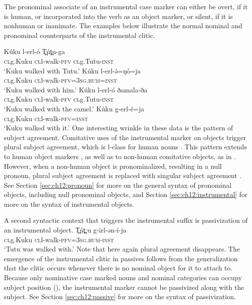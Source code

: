 The pronominal associate of an instrumental case marker can either be overt, if it is human, or incorporated into the verb as an object marker, or silent, if it is nonhuman or inanimate. The examples below illustrate the normal nominal and pronominal counterparts of the instrumental clitic.

\ea 
	\ea	\gll	 Kúku        l-erl-ó             T̪út̪u-ga	\\
				\textsc{cl}g.Kuku \textsc{cl}l-walk-\textsc{pfv} \textsc{cl}g.Tutu-\textsc{inst}		\\
		\glt `Kuku walked with Tutu.'  \label{ex:ch11:witha}
	\ex	\gll	 Kúku        l-erl-ə́=ŋó=ja	\\
				\textsc{cl}g.Kuku \textsc{cl}l-walk-\textsc{pfv}=\textsc{3sg.hum}=\textsc{inst}		\\
		\glt `Kuku walked with him.'\label{ex:ch11:withb}
	\z
\ex	\ea	\gll	 Kúku        l-erl-ó             ðamala-ða	\\
				\textsc{cl}g.Kuku \textsc{cl}l-walk-\textsc{pfv} \textsc{cl}g.Tutu-\textsc{inst}		\\
		\glt `Kuku walked with the camel.' \label{ex:ch11:withcamela}
	\ex	\gll	 Kúku        g-erl-é=ja	\\
				\textsc{cl}g.Kuku \textsc{cl}l-walk-\textsc{pfv}=\textsc{inst}		\\
		\glt `Kuku walked with it.' \label{ex:ch11:withcamelb}
	\z 
\z 
One interesting wrinkle in these data is the pattern of subject agreement. Comitative uses of the instrumental marker on objects trigger plural subject agreement, which is l-class for human nouns . This pattern extends to human object markers , as well as to non-human comitative objects, as in . However, when a non-human object is pronominalized, resulting in a null pronoun, plural subject agreement is replaced with singular subject agreement . See Section \ref{sec:ch12:pronoun} for more on the general syntax of pronominal objects, including null pronominal objects, and Section \ref{sec:ch12:instrumental} for more on the syntax of instrumental objects. %

A second syntactic context that triggers the instrumental suffix is passivization of an instrumental object.
\ea 
	\gll	 T̪út̪:u        g-irl-ən-í-ja	\\
				\textsc{cl}g.Kuku \textsc{cl}l-walk-\textsc{pfv}=\textsc{3sg.hum}-\textsc{inst}		\\
		\glt `Tutu was walked with.'
\z
Note that here again plural agreement disappears. The emergence of the instrumental clitic in passives follows from the generalization that the clitic occurs whenever there is no nominal object for it to attach to. Because only nominative case marked nouns and nominal categories can occupy subject position (), the instrumental marker cannot be passivized along with the subject. See Section \ref{sec:ch12:passive} for more on the syntax of passivization. 

